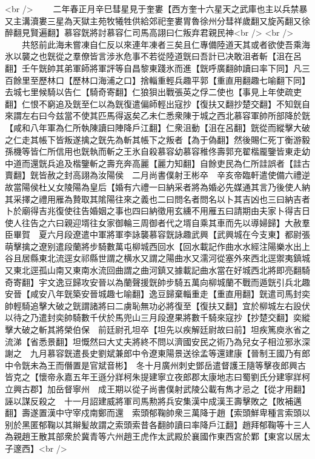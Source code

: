 <br />
　　二年春正月辛巳彗星見于奎婁【西方奎十六星天之武庫也主以兵禁暴又主溝瀆婁三星為天獄主苑牧犧牲供給郊祀奎婁胃魯徐州分彗祥歲翻又旋芮翻又徐醉翻見賢遍翻】慕容皝將討慕容仁司馬高詡曰仁叛弃君親民神<br />
<br />
　　共怒前此海未嘗凍自仁反以來連年凍者三矣且仁專備陸道天其或者欲使吾乘海氷以襲之也皝從之羣僚皆言涉氷危事不若從陸道皝曰吾計已决敢沮者斬【沮在呂翻】壬午皝帥其弟軍師將軍評等自昌黎東踐氷而進【皝呼廣翻帥讀曰率下同】凡三百餘里至歷林口【歷林口海浦之口】捨輜重輕兵趣平郭【重直用翻趣七喻翻下同】去城七里候騎以告仁【騎奇寄翻】仁狼狽出戰張英之俘二使也【事見上年使疏吏翻】仁恨不窮追及皝至仁以為皝復遣偏師輕出寇抄【復扶又翻抄楚交翻】不知皝自來謂左右曰今兹當不使其匹馬得返矣乙未仁悉衆陳于城之西北慕容軍帥所部降於皝【咸和八年軍為仁所執陳讀曰陣降戶江翻】仁衆沮動【沮在呂翻】皝從而縱擊大破之仁走其帳下皆叛遂擒之皝先為斬其帳下之叛者【為于偽翻】然後賜仁死丁衡游毅孫機等皆仁所信用也皝執而斬之王氷自殺慕容幼慕容稚佟壽郭充翟楷龎鑒皆東走幼中道而還皝兵追及楷鑒斬之壽充奔高麗【麗力知翻】自餘吏民為仁所詿誤者【詿古賣翻】皝皆赦之封高詡為汝陽侯　二月尚書僕射王彬卒　辛亥帝臨軒遣使備六禮逆故當陽侯杜乂女陵陽為皇后【婚有六禮一曰納采者將為婚必先媒通其言乃後使人納其采擇之禮用雁為贄取其隂陽往來之義也二曰問名者問名以卜其吉凶也三曰納吉者卜於廟得吉兆復使往告婚姻之事也四曰納徵用玄纁不用雁五曰請期由夫家卜得吉日使人往告之六曰親迎壻往女家御輪三周御者代之壻自乘其車而先以導婦歸】大赦羣臣畢賀　夏六月段遼遣中軍將軍李詠襲慕容皝詠趣武興【武興城在今支東】都尉張萌擊擒之遼别遣段蘭將步騎數萬屯柳城西回水【回水載記作曲水水經注陽樂水出上谷且居縣東北流逕女祁縣世謂之横水又謂之陽曲水又濡河從塞外來西北逕禦夷鎮城又東北逕孤山南又東南水流回曲謂之曲河鎮又據載記曲水當在好城西北將即亮翻騎奇寄翻】宇文逸豆歸攻安晉以為蘭聲援皝帥步騎五萬向柳城蘭不戰而遁皝引兵北趣安晉【咸安八年皝築安晉城趣七喻翻】逸豆歸棄輜重走【重直用翻】皝遣司馬封奕帥輕騎追擊大破之皝謂諸將曰二虜恥無功必將復至【復扶又翻】宜於柳城左右設伏以待之乃遣封奕帥騎數千伏於馬兜山三月段遼果將數千騎來寇抄【抄楚交翻】奕縱擊大破之斬其將榮伯保　前廷尉孔坦卒【坦先以疾解廷尉故曰前】坦疾篤庾氷省之流涕【省悉景翻】坦慨然曰大丈夫將終不問以濟國安民之術乃為兒女子相泣邪氷深謝之　九月慕容皝遣長史劉斌兼郎中令遼東陽景送徐孟等還建康【晉制王國乃有郎中令皝未為王而僭置是官斌音彬】　冬十月廣州刺史鄧岳遣督護王隨等擊夜郎興古皆克之【懷帝永嘉五年王遜分牂柯朱提建寧立夜郎郡太康地志曰蜀劉氏分建寧牂柯立興古郡】加岳督寧州　成王期以從子尚書僕射武陵公載有雋才忌之【從才用翻】誣以謀反殺之　十一月詔建威將軍司馬勲將兵安集漢中成漢王壽擊敗之【敗補邁翻】壽遂置漢中守宰戍南鄭而還　索頭郁鞠帥衆三萬降于趙【索頭鮮卑種言索頭以别於黑匿郁鞠以其辮髪故謂之索頭索昔各翻帥讀曰率降戶江翻】趙拜郁鞠等十三人為親趙王散其部衆於冀青等六州趙王虎作太武殿於襄國作東西宮於鄴【東宮以居太子邃西】<br />
